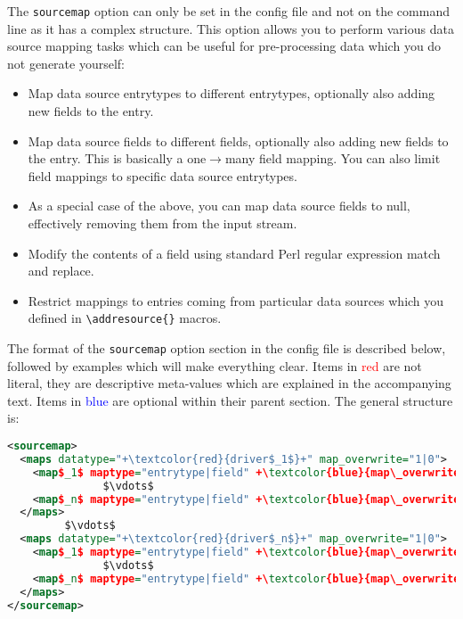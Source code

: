 \documentclass{ltxdockit}
\begin{document}
The \verb+sourcemap+ option can only be set in the config file
and not on the command line as it has a complex structure. This
option allows you to perform various data source mapping
tasks which can be useful for pre-processing data which you do not
generate yourself:

\begin{itemize}
\item Map data source entrytypes to different entrytypes,
  optionally also adding new fields to the entry.
\item Map data source fields to different fields,
  optionally also adding new fields to the entry. This is basically a
  one$\rightarrow$many field mapping. You can also limit field
  mappings to specific data source entrytypes.
\item As a special case of the above, you can map data source fields
  to null, effectively removing them from the input stream.
\item Modify the contents of a field using standard Perl regular expression
  match and replace.
\item Restrict mappings to entries coming from particular data sources
  which you defined in \verb+\addresource{}+ macros.
\end{itemize}

\noindent The format of the \verb+sourcemap+ option section in the
config file is described below, followed by examples which will make
everything clear. Items in \textcolor{red}{red} are not
literal, they are descriptive meta-values which are explained in the
accompanying text. Items in \textcolor{blue}{blue} are optional within
their parent section. The general structure is:

\lstset{showspaces=false}
\begin{lstlisting}[language=xml,escapechar=+,mathescape=true]
<sourcemap>
  <maps datatype="+\textcolor{red}{driver$_1$}+" map_overwrite="1|0">
    <map$_1$ maptype="entrytype|field" +\textcolor{blue}{map\_overwrite="1|0"}+> ... </map$_1$>
               $\vdots$
    <map$_n$ maptype="entrytype|field" +\textcolor{blue}{map\_overwrite="1|0"}+> ... </map$_n$>
  </maps>
         $\vdots$
  <maps datatype="+\textcolor{red}{driver$_n$}+" map_overwrite="1|0">
    <map$_1$ maptype="entrytype|field" +\textcolor{blue}{map\_overwrite="1|0"}+> ... </map$_1$>
               $\vdots$
    <map$_n$ maptype="entrytype|field" +\textcolor{blue}{map\_overwrite="1|0"}+> ... </map$_n$>
  </maps>
</sourcemap>
\end{lstlisting}
\end{document}
